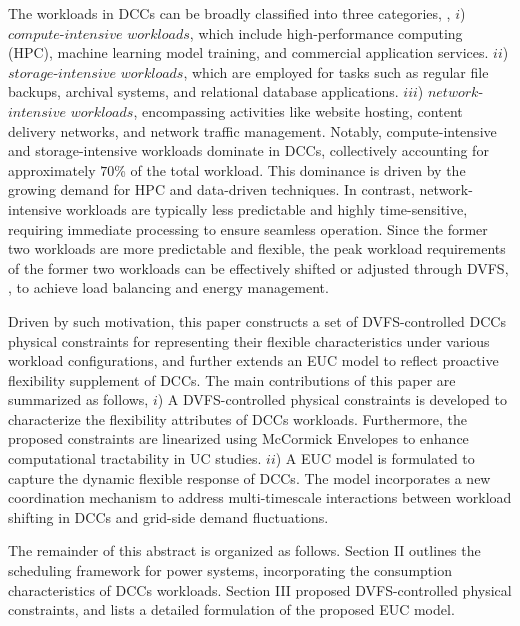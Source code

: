 \documentclass[lettersize,journal]{IEEEtran}
\begin{document}
The workloads in DCCs can be broadly classified into three categories, \cite{6041050}, $i$) $compute$-$intensive$ $workloads$, which include high-performance computing (HPC), machine learning model training, and commercial application services. $ii$) $storage$-$intensive$ $workloads$, which are employed for tasks such as regular file backups, archival systems, and relational database applications. $iii$) $network$-$intensive$ $workloads$, encompassing activities like website hosting, content delivery networks, and network traffic management. Notably, compute-intensive and storage-intensive workloads dominate in DCCs, collectively accounting for approximately $70$\% of the total workload. This dominance is driven by the growing demand for HPC and data-driven techniques. In contrast, network-intensive workloads are typically less predictable and highly time-sensitive, requiring immediate processing to ensure seamless operation. Since the former two workloads are more predictable and flexible, the peak workload requirements of the former two workloads can be effectively shifted or adjusted through DVFS, \cite{lin2023workload,7039172,6041050}, to achieve load balancing and energy management.

Driven by such motivation, this paper constructs a set of DVFS-controlled DCCs physical constraints for representing their flexible characteristics under various workload configurations, and further extends an EUC model to reflect proactive flexibility supplement of DCCs. The main contributions of this paper are summarized as follows,
$i$) A DVFS-controlled physical constraints is developed to characterize the flexibility attributes of DCCs workloads. Furthermore, the proposed constraints are linearized using McCormick Envelopes to enhance computational tractability in UC studies.
$ii$) A EUC model is formulated to capture the dynamic flexible response of DCCs. The model incorporates a new coordination mechanism to address multi-timescale interactions between workload shifting in DCCs and grid-side demand fluctuations.

The remainder of this abstract is organized as follows. Section II outlines the scheduling framework for power systems, incorporating the consumption characteristics of DCCs workloads. Section III proposed DVFS-controlled physical constraints, and lists a detailed formulation of the proposed EUC model.

\vspace{-0.25cm}
\end{document}

